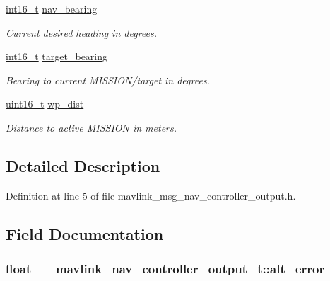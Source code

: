 \begin{DoxyCompactItemize}
\hyperlink{stdint_8h_aa343fa3b3d06292b959ffdd4c4703b06}{int16\-\_\-t} \hyperlink{struct____mavlink__nav__controller__output__t_ae18c3d9716a9ec77450d9acf03ea1f64}{nav\-\_\-bearing}
\begin{DoxyCompactList}\small\item\em Current desired heading in degrees. \end{DoxyCompactList}\item 
\hyperlink{stdint_8h_aa343fa3b3d06292b959ffdd4c4703b06}{int16\-\_\-t} \hyperlink{struct____mavlink__nav__controller__output__t_a4601945c2201a6dcaca7acc5154e087e}{target\-\_\-bearing}
\begin{DoxyCompactList}\small\item\em Bearing to current M\-I\-S\-S\-I\-O\-N/target in degrees. \end{DoxyCompactList}\item 
\hyperlink{stdint_8h_a273cf69d639a59973b6019625df33e30}{uint16\-\_\-t} \hyperlink{struct____mavlink__nav__controller__output__t_aa7d7186c64fdd4cf8a0ace5bd2a071f1}{wp\-\_\-dist}
\begin{DoxyCompactList}\small\item\em Distance to active M\-I\-S\-S\-I\-O\-N in meters. \end{DoxyCompactList}\end{DoxyCompactItemize}


\subsection{Detailed Description}


Definition at line 5 of file mavlink\-\_\-msg\-\_\-nav\-\_\-controller\-\_\-output.\-h.



\subsection{Field Documentation}
\hypertarget{struct____mavlink__nav__controller__output__t_a40a6a20a742864361b047967ce7eb9df}{
\subsubsection[{alt\-\_\-error}]{\setlength{\rightskip}{0pt plus 5cm}float \-\_\-\-\_\-mavlink\-\_\-nav\-\_\-controller\-\_\-output\-\_\-t\-::alt\-\_\-error}}\label{struct____mavlink__nav__controller__output__t_a40a6a20a742864361b047967ce7eb9df}



